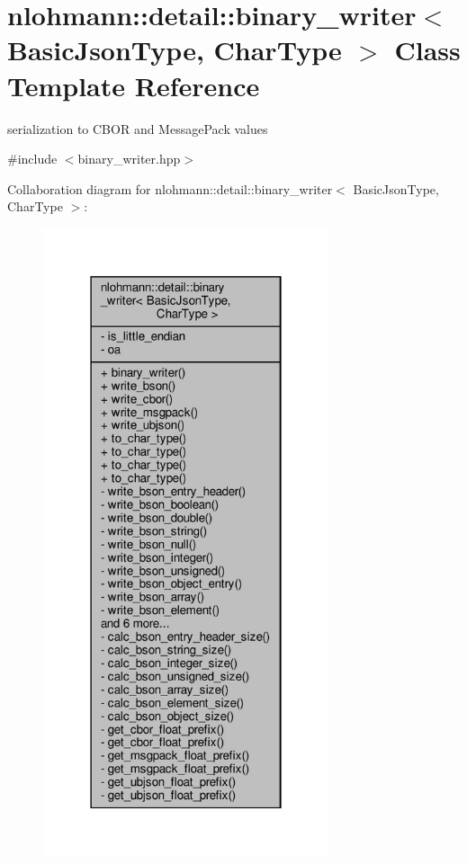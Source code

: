 \hypertarget{classnlohmann_1_1detail_1_1binary__writer}{}\section{nlohmann\+:\+:detail\+:\+:binary\+\_\+writer$<$ Basic\+Json\+Type, Char\+Type $>$ Class Template Reference}
\label{classnlohmann_1_1detail_1_1binary__writer}


serialization to C\+B\+OR and Message\+Pack values  




{\ttfamily \#include $<$binary\+\_\+writer.\+hpp$>$}



Collaboration diagram for nlohmann\+:\+:detail\+:\+:binary\+\_\+writer$<$ Basic\+Json\+Type, Char\+Type $>$\+:
\nopagebreak
\begin{figure}[H]
\begin{center}
\leavevmode
\includegraphics[width=238pt]{classnlohmann_1_1detail_1_1binary__writer__coll__graph}
\end{center}
\end{figure}
